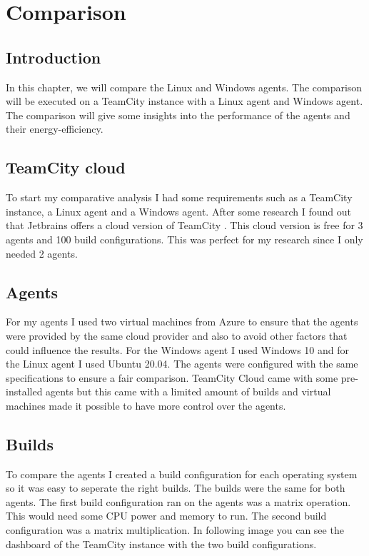 
\chapter{Comparison}%
\label{ch:comparison}

\section{Introduction}%
\label{sec:introduction-comparison}
In this chapter, we will compare the Linux and Windows agents. The comparison will be executed on a TeamCity instance with a Linux agent and Windows agent. The comparison will give some insights into the performance of the agents and their energy-efficiency.

\section{TeamCity cloud}%
\label{sec:teamcity-cloud}
To start my comparative analysis I had some requirements such as a TeamCity instance, a Linux agent and a Windows agent. After some research I found out that Jetbrains offers a cloud version of TeamCity \autocite{Bevan2021}. This cloud version is free for 3 agents and 100 build configurations. This was perfect for my research since I only needed 2 agents. 

\section{Agents}
For my agents I used two virtual machines from Azure to ensure that the agents were provided by the same cloud provider and also to avoid other factors that could influence the results. For the Windows agent I used Windows 10 and for the Linux agent I used Ubuntu 20.04. The agents were configured with the same specifications to ensure a fair comparison. TeamCity Cloud came with some pre-installed agents but this came with a limited amount of builds and virtual machines made it possible to have more control over the agents.

\section{Builds}
To compare the agents I created a build configuration for each operating system so it was easy to seperate the right builds. The builds were the same for both agents. The first build configuration ran on the agents was a matrix operation. This would need some CPU power and memory to run. The second build configuration was a matrix multiplication. In following image you can see the dashboard of the TeamCity instance with the two build configurations.

